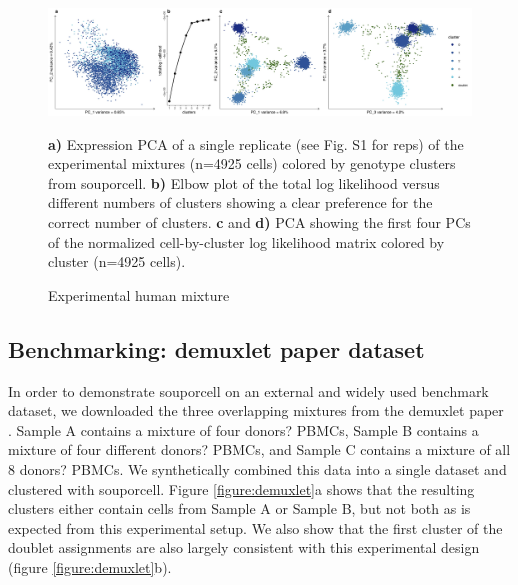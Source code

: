 \begin{figure}[th!]
\caption{Experimental human mixture}
\label{figure:real}
\begin{centering}

\includegraphics[width=\textwidth]{realmix.jpg} 
\par{\textbf{a)} Expression PCA of a single replicate (see Fig. S1 for reps) of the experimental mixtures (n=4925 cells) colored by genotype clusters from souporcell. \textbf{b)} Elbow plot of the total log likelihood versus different numbers of clusters showing a clear preference for the correct number of clusters. \textbf{c} and \textbf{d)} PCA showing the first four PCs of the normalized cell-by-cluster log likelihood matrix colored by cluster (n=4925 cells).}
\end{centering}
\end{figure}





\subsection{Benchmarking: demuxlet paper dataset}

\par{
In order to demonstrate souporcell on an external and widely used benchmark dataset, we downloaded the
three overlapping mixtures from the demuxlet paper\cite{demuxlet}
. Sample A contains a mixture of four donors?
PBMCs, Sample B contains a mixture of four different donors? PBMCs, and Sample C contains a mixture
of all 8 donors? PBMCs. We synthetically combined this data into a single dataset and clustered with
souporcell. Figure \ref{figure:demuxlet}a shows that the resulting clusters either contain cells from Sample A or Sample B,
but not both as is expected from this experimental setup. We also show that the first cluster of the doublet
assignments are also largely consistent with this experimental design (figure \ref{figure:demuxlet}b). 
}


